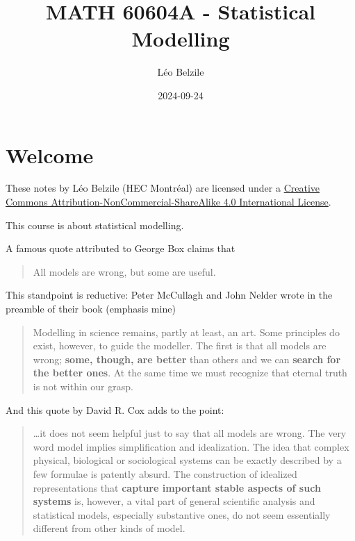 \documentclass[
  11pt,
  letterpaper,
]{scrbook}
\title{MATH 60604A - Statistical Modelling}
\author{Léo Belzile}
\date{2024-09-24}
\renewcommand*\contentsname{Table of contents}
\newcommand\contentsname{Table of contents}
\theoremstyle{definition}
\theoremstyle{definition}
\theoremstyle{plain}
\theoremstyle{plain}
\theoremstyle{remark}
\begin{document}


\renewcommand*\contentsname{Table of contents}
{
\setcounter{tocdepth}{2}
\tableofcontents
}

\mainmatter
{}

\chapter*{Welcome}\label{welcome}


These notes by Léo Belzile (HEC Montréal) are licensed under a
\href{http://creativecommons.org/licenses/by-nc-sa/4.0/}{Creative
Commons Attribution-NonCommercial-ShareAlike 4.0 International License}.

This course is about statistical modelling.

A famous quote attributed to George Box claims that

\begin{quote}
All models are wrong, but some are useful.
\end{quote}

This standpoint is reductive: Peter McCullagh and John Nelder wrote in
the preamble of their book (emphasis mine)

\begin{quote}
Modelling in science remains, partly at least, an art. Some principles
do exist, however, to guide the modeller. The first is that all models
are wrong; \textbf{some, though, are better} than others and we can
\textbf{search for the better ones}. At the same time we must recognize
that eternal truth is not within our grasp.
\end{quote}

And this quote by David R. Cox adds to the point:

\begin{quote}
\ldots it does not seem helpful just to say that all models are wrong.
The very word model implies simplification and idealization. The idea
that complex physical, biological or sociological systems can be exactly
described by a few formulae is patently absurd. The construction of
idealized representations that \textbf{capture important stable aspects
of such systems} is, however, a vital part of general scientific
analysis and statistical models, especially substantive ones, do not
seem essentially different from other kinds of model.
\end{quote}
\end{document}

